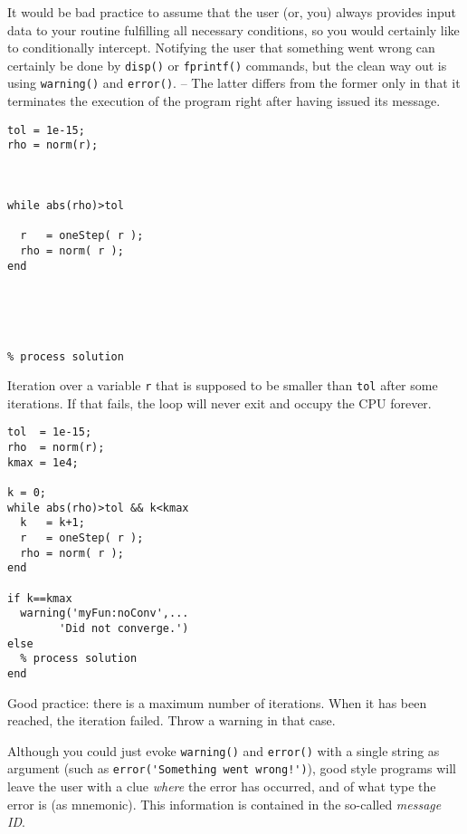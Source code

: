 It would be bad practice to assume that the user (or, you) always provides
input data to your routine fulfilling all necessary conditions, so you would
certainly like to conditionally intercept. Notifying the user that something
went wrong can certainly be done by \lstinline!disp()! or
\lstinline!fprintf()! commands, but the clean way out is using
\lstinline!warning()! and \lstinline!error()!. -- The latter differs from the
former only in that it terminates the execution of the program right after
having issued its message.

\hfill
\begin{minipage}[t]{.45\textwidth}
\begin{lstlisting}[framerule=2pt,rulecolor=\color{badred}]
tol = 1e-15;
rho = norm(r);



while abs(rho)>tol

  r   = oneStep( r );
  rho = norm( r );
end





% process solution

\end{lstlisting}
Iteration over a variable \lstinline!r! that is supposed to be smaller than \lstinline!tol! after some iterations. If that fails, the loop will never exit and occupy the CPU forever.
\end{minipage}
\hfill
\begin{minipage}[t]{.45\textwidth}
\begin{lstlisting}[framerule=2pt,rulecolor=\color{goodgreen}]
tol  = 1e-15;
rho  = norm(r);
kmax = 1e4;

k = 0;
while abs(rho)>tol && k<kmax
  k   = k+1;
  r   = oneStep( r );
  rho = norm( r );
end

if k==kmax
  warning('myFun:noConv',...
        'Did not converge.')
else
  % process solution
end
\end{lstlisting}
Good practice: there is a maximum number of iterations. When it has been reached, the iteration failed. Throw a warning in that case.
\end{minipage}
\hfill

Although you could just evoke \lstinline!warning()! and \lstinline!error()! with a single string as argument (such as \lstinline~error('Something went wrong!')~), good style programs will leave the user with a clue \emph{where} the error has occurred, and of what type the error is (as mnemonic). This information is contained in the so-called \emph{message ID}.

